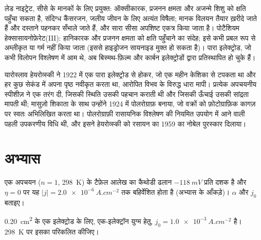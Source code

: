 \begin{safety}{}
लेड नाइट्रेट, सीसे के मानकों के लिए प्रयुक्त: ऑक्सीकारक, प्रजनन क्षमता और
अजन्मे शिशु को क्षति पहुँचा सकता है, संदिग्ध कैंसरजन, जलीय जीवन के लिए अत्यंत विषैला; मानक
विलयन तैयार ख़रीदे जाते हैं और दस्ताने पहनकर सँभाले जाते हैं, और सारा सीसा अपशिष्ट
एकत्र किया जाता है। पोटैशियम हेक्सासायनोफ़ेरेट(III): हानिकारक और प्रजनन क्षमता को क्षति
पहुँचाने का संदेह; इसे कभी प्रबल रूप से अम्लीकृत या गर्म नहीं किया जाता (इससे हाइड्रोजन
सायनाइड मुक्त हो सकता है)। पारा इलेक्ट्रोड, जो कभी विलोपन विश्लेषण में आम थे,
अब बिस्मथ-फ़िल्म और कार्बन इलेक्ट्रोडों द्वारा प्रतिस्थापित हो चुके हैं।
\end{safety}

\begin{history}[हेयरोव्स्की का पोलरोग्राफ़, 1922]
यारोस्लाव हेयरोव्स्की ने 1922 में एक पारा इलेक्ट्रोड से होकर, जो एक महीन केशिका से
टपकता था और हर कुछ सेकंड में अपना पृष्ठ नवीकृत करता था, आरोपित विभव
के विरुद्ध धारा मापी। प्रत्येक अपचयनीय स्पीशीज़ ने एक तरंग दी, जिसकी
स्थिति उसकी पहचान कराती थी और जिसकी ऊँचाई उसकी सांद्रता मापती थी;
मासुज़ो शिकाता के साथ उन्होंने 1924 में पोलरोग्राफ़ बनाया, जो वक्रों को
फ़ोटोग्राफ़िक कागज़ पर स्वतः अभिलिखित करता था। पोलरोग्राफ़ी रासायनिक विश्लेषण की
नियमित उपयोग में आने वाली पहली उपकरणीय विधि थी, और इसने हेयरोव्स्की को रसायन का 1959 का
नोबेल पुरस्कार दिलाया।
\end{history}

\section{अभ्यास}

\begin{exercise}[$\star$]\label{exo:b3:electrode-kinetics:1}
एक अपचयन ($n = 1$, \qty{298}{K}) के टैफ़ेल आलेख का कैथोडी ढलान $-\qty{118}{mV}$
प्रति दशक है और $\eta = 0$ पर यह $|j| = \qty{2.0e-6}{A.cm^{-2}}$ तक बहिर्वेशित होता है (अभ्यास के आँकड़े)।
$\alpha$ और $j_0$ बताइए।
\end{exercise}

\begin{exercise}[$\star$]\label{exo:b3:electrode-kinetics:2}
\qty{0.20}{cm^2} के एक इलेक्ट्रोड के लिए, एक-इलेक्ट्रॉन युग्म हेतु, $j_0 = \qty{1.0e-3}{A.cm^{-2}}$ है।
\qty{298}{K} पर इसका  परिकलित कीजिए।
\end{exercise}

